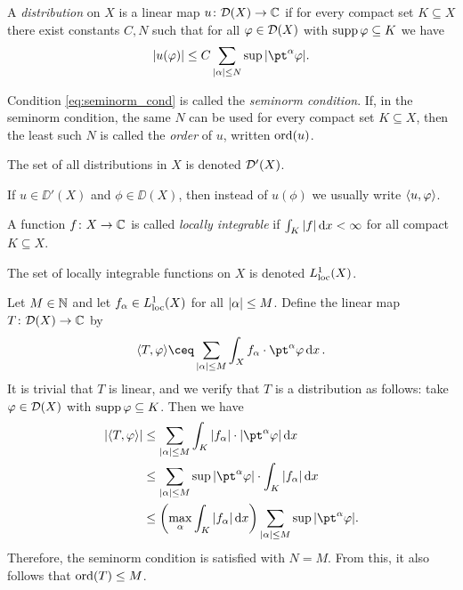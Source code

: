 \begin{definition}
    A \emph{distribution} on $X$ is a linear map $u \colon \mathcal D(X) \to \mathbb C$ if for every compact set $K \subseteq X$ there exist constants $C, N$ such that for all $\varphi \in \mathcal D(X)$ with $\operatorname{supp}\varphi\subseteq K$ we have
    \begin{equation} \label{eq:seminorm_cond}
        \abs{u(\phi)} \leq C \sum_{\abs{\alpha} \leq N} \sup \abs{\pt^\alpha \phi}.
    \end{equation}

Condition \ref{eq:seminorm_cond} is called the \emph{seminorm condition}. If, in the seminorm condition, the same $N$ can be used for every compact set $K \subseteq X$, then the least such $N$ is called the \emph{order} of $u$, written $\operatorname{ord}(u)$. 

The set of all distributions in $X$ is denoted $\mathcal D'(X)$. 
\end{definition}

If $u \in \DD'(X)$ and $\phi \in \DD(X)$, then instead of $u(\phi)$ we usually write $\langle u, \varphi\rangle$.

\begin{recap}
    A function $f \colon X \to \mathbb C$ is called \emph{locally integrable} if $\int_K \abs{f} \dd{x} < \infty$ for all compact $K \subseteq X$. 
    
    The set of locally integrable functions on $X$ is denoted $L^1_{\mathrm{loc}}(X)$. 
\end{recap}

\begin{example}
    Let $M \in \mathbb N$ and let $f_\alpha \in L^1_{\mathrm{loc}}(X)$ for all $\abs{\alpha} \leq M$. Define the linear map $T \colon \mathcal D(X) \to \mathbb C$ by
    \[
    \ang{T, \phi} \ceq \sum_{\abs{\alpha} \leq M} \int_X f_\alpha \cdot \pt^\alpha \phi \dd{x}. 
    \]
    It is trivial that $T$ is linear, and we verify that $T$ is a distribution as follows: take $\varphi \in \mathcal D(X)$ with $\operatorname{supp}\varphi \subseteq K$. Then we have
    \begin{align*}
        \abs{\ang{T, \phi}} &\leq \sum_{\abs{\alpha} \leq M} \int_K \abs{f_\alpha} \cdot \abs{\pt^\alpha \phi} \dd{x} \\
        &\leq \sum_{\abs{\alpha} \leq M} \sup \abs{\pt^\alpha \phi} \cdot \int_K \abs{f_\alpha} \dd{x} \\
        &\leq \qty(\max_\alpha \int_K \abs{f_\alpha} \dd{x})   \sum_{\abs{\alpha} \leq M} \sup \abs{\pt^\alpha \phi}. 
    \end{align*}
Therefore, the seminorm condition is satisfied with $N = M$. From this, it also follows that $\operatorname{ord}(T) \leq M$. 
\end{example}

